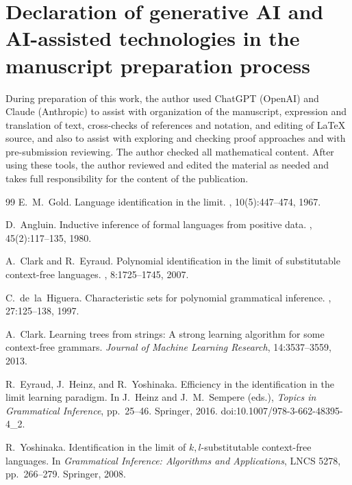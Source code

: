\documentclass[11pt]{article}
\numberwithin{equation}{section}
\theoremstyle{plain}
\theoremstyle{definition}
\theoremstyle{remark}
\theoremstyle{plain}
\begin{document}
\section*{Declaration of generative AI and AI-assisted technologies in the manuscript preparation process}
During preparation of this work, the author used ChatGPT (OpenAI) and Claude
(Anthropic) to assist with organization of the manuscript, expression and
translation of text, cross-checks of references and notation, and editing of
\LaTeX{} source, and also to assist with exploring and checking proof
approaches and with pre-submission reviewing. The author checked all
mathematical content. After using these tools, the author reviewed and edited the
material as needed and takes full responsibility for the content of the publication.


\begin{thebibliography}{99}
E.~M.~Gold.
\newblock Language identification in the limit.
, 10(5):447--474, 1967.

D.~Angluin.
\newblock Inductive inference of formal languages from positive data.
, 45(2):117--135, 1980.

A.~Clark and R.~Eyraud.
\newblock Polynomial identification in the limit of substitutable context-free
languages.
, 8:1725--1745, 2007.

C.~de~la~Higuera.
\newblock Characteristic sets for polynomial grammatical inference.
, 27:125--138, 1997.

A.~Clark.
\newblock Learning trees from strings: A strong learning algorithm for some context-free grammars.
\newblock \emph{Journal of Machine Learning Research}, 14:3537--3559, 2013.

R.~Eyraud, J.~Heinz, and R.~Yoshinaka.
\newblock Efficiency in the identification in the limit learning paradigm.
\newblock In J.~Heinz and J.~M.~Sempere (eds.), {\em Topics in Grammatical
Inference}, pp.~25--46. Springer, 2016.
\newblock doi:10.1007/978-3-662-48395-4\_2.

R.~Yoshinaka.
\newblock Identification in the limit of $k,l$-substitutable context-free
languages.
\newblock In {\em Grammatical Inference: Algorithms and Applications},
LNCS 5278, pp.~266--279. Springer, 2008.


\end{thebibliography}
\end{document}
